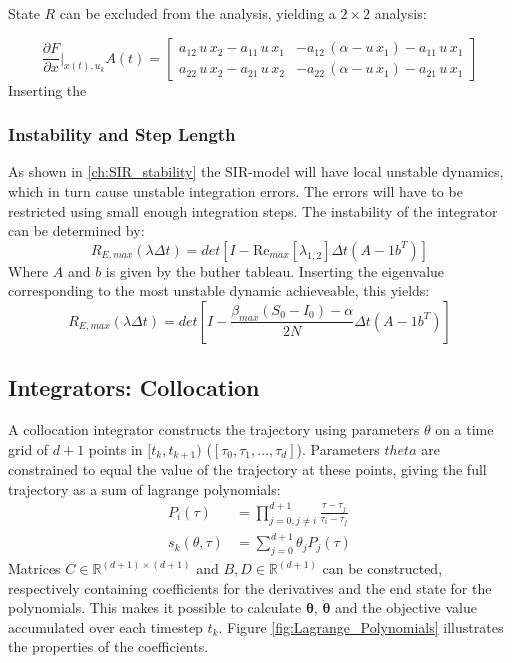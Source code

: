 State $R$ can be excluded from the analysis, yielding a $2\times 2$ analysis:

\begin{equation}
\frac{\partial F}{\partial x}|_{x(t),u_k} A(t) = 
\begin{bmatrix}
    a_{12}\,u\,x_{2}-a_{11}\,u\,x_{1} & -a_{12}\,\left(\alpha-u\,x_{1}\right)-a_{11}\,u\,x_{1}\\ a_{22}\,u\,x_{2}-a_{21}\,u\,x_{2} & -a_{22}\,\left(\alpha-u\,x_{1}\right)-a_{21}\,u\,x_{1} 
    \end{bmatrix}
\end{equation}
Inserting the 
\fi

\subsubsection{Instability and Step Length}
As shown in \ref{ch:SIR_stability} the SIR-model will have local unstable dynamics, which in turn cause unstable integration errors. The errors will have to be restricted using small enough integration steps. The instability of the integrator can be determined by:
\begin{equation}
    R_{E, max}(\lambda \Delta t) = det[I-\text{Re}_{max}[\lambda_{1,2}] \Delta t(A - 1b^T)]
\end{equation}
Where $A$ and $b$ is given by the buther tableau. Inserting the eigenvalue corresponding to the most unstable dynamic achieveable, this yields:
\begin{equation}
    R_{E, max}(\lambda \Delta t) = det[I- \frac{\beta_{max}(S_0-I_0) - \alpha}{2N} \Delta t(A - 1b^T)]
\end{equation}
\fi
\subsection{Integrators: Collocation}
A collocation integrator constructs the trajectory using
parameters $\theta$ on a time grid of $d+1$ points in $[t_k, t_{k+1})$ ($[\tau_0, \tau_1, \dots, \tau_d]$). Parameters $theta$ are constrained to equal the value of the trajectory at these points, giving the full trajectory as a sum of lagrange polynomials:
\begin{align}
    P_i(\tau) &= \prod_{j=0, j \neq i}^{d+1} \frac{\tau-\tau_j}{\tau_i - \tau_j}\\
    s_k(\theta, \tau) &= \sum_{j=0}^{d+1} \theta_j P_j(\tau)
\end{align}
Matrices $C \in \mathbb{R}^{(d+1)\times(d+1)}$ and $B, D \in \mathbb{R}^{(d+1)}$ can be constructed, respectively containing coefficients for the derivatives and the end state for the polynomials. This makes it possible to calculate $\bm{\theta}$, $\bm{\dot{\theta}}$ and the objective value accumulated over each timestep $t_k$. Figure \ref{fig:Lagrange_Polynomials} illustrates the properties of the coefficients.


